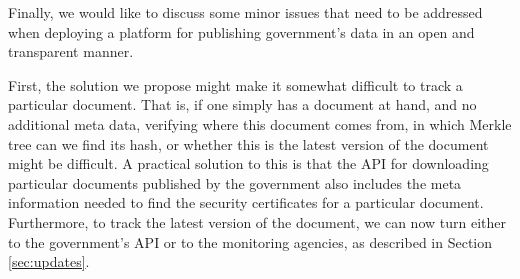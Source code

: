 	
Finally, we would like to discuss some minor issues that need to be addressed when deploying a platform for publishing government's data in an open and transparent manner.

First, the solution we propose might make it somewhat difficult to track a particular document. That is, if one simply has a document at hand, and no additional meta data, verifying where this document comes from, in which Merkle tree can we find its hash, or whether this is the latest version of the document might be difficult. A practical solution to this is that the API for downloading particular documents published by the government also includes the meta information needed to find the security certificates for a particular document. Furthermore, to track the latest version of the document, we can now turn either to the government's API or to the monitoring agencies, as described in Section \ref{sec:updates}.




